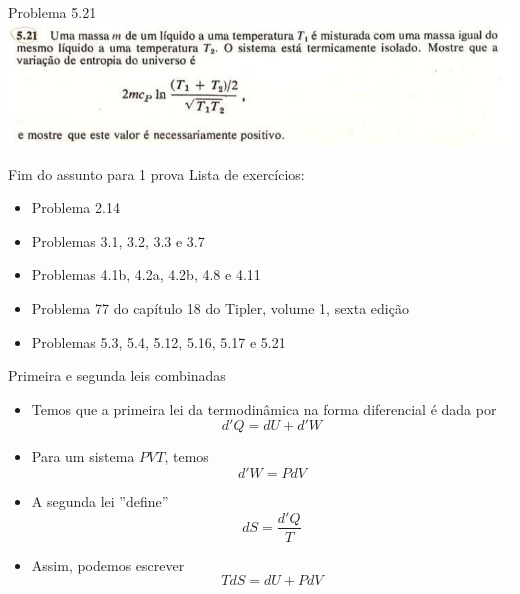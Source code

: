 \documentclass[t,%
brazilian,%
11pt,%
aspectratio=169,%
table%
]{beamer}
\newcommand{\esima}{\textordfeminine }
\begin{document}
\begin{frame}{Problema 5.21}
    \centering
    \includegraphics[width=\textwidth]{images/Captura de tela de 2025-04-29 08-54-57.png}
\end{frame}

\begin{frame}{Fim do assunto para 1\esima{} prova}
    Lista de exercícios:
    \begin{itemize}
        \item Problema 2.14
        \item Problemas 3.1, 3.2, 3.3 e 3.7
        \item Problemas 4.1b, 4.2a, 4.2b, 4.8 e 4.11
        \item Problema 77 do capítulo 18 do Tipler, volume 1, sexta edição
        \item Problemas 5.3, 5.4, 5.12, 5.16, 5.17 e 5.21
    \end{itemize}
\end{frame}


\begin{frame}{Primeira e segunda leis combinadas}
    \begin{itemize}
        \item Temos que a primeira lei da termodinâmica na forma diferencial é dada por
            \[
                d'Q=dU+d'W
            \]
        \item Para um sistema \(PVT\), temos
            \[
                d'W=PdV
            \]
        \item A segunda lei ''define''
            \[
                dS = \frac{d'Q}{T}
            \]
        \item Assim, podemos escrever
            \[
                TdS=dU + PdV
            \]

    \end{itemize}
\end{frame}
\end{document}
